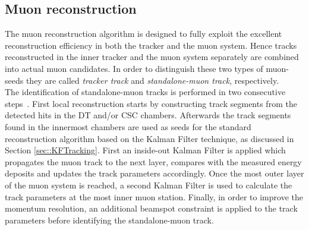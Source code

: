 \subsection{Muon reconstruction}\label{subsec::Muon}

The muon reconstruction algorithm is designed to fully exploit the excellent reconstruction efficiency in both the tracker and the muon system.
Hence tracks reconstructed in the inner tracker and the muon system separately are combined into actual muon candidates. In order to distinguish these two types of muon-seeds they are called \textit{tracker track} and \textit{standalone-muon track}, respectively.
\\
The identification of standalone-muon tracks is performed in two consecutive steps~\cite{CMSTDR, MuonReco}. First local reconstruction starts by constructing track segments from the detected hits in the DT and/or CSC chambers. Afterwards the track segments found in the innermost chambers are used as seeds for the standard reconstruction algorithm based on the Kalman Filter technique, as discussed in Section \ref{sec::KFTracking}. First an inside-out Kalman Filter is applied which propagates the muon track to the next layer, compares with the measured energy deposits and updates the track parameters accordingly. Once the most outer layer of the muon system is reached, a second Kalman Filter is used to calculate the track parameters at the most inner muon station. Finally, in order to improve the momentum resolution, an additional beamspot constraint is applied to the track parameters before identifying the standalone-muon track.
\\


